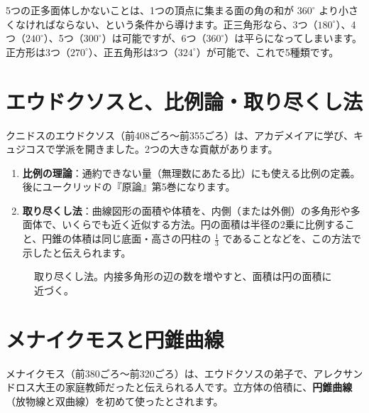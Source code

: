 \documentclass[a4paper,11pt,openany]{ltjsbook}
\begin{document}
5つの正多面体しかないことは、1つの頂点に集まる面の角の和が $360^\circ$ より小さくなければならない、という条件から導けます。正三角形なら、3つ（$180^\circ$）、4つ（$240^\circ$）、5つ（$300^\circ$）は可能ですが、6つ（$360^\circ$）は平らになってしまいます。正方形は3つ（$270^\circ$）、正五角形は3つ（$324^\circ$）が可能で、これで5種類です。

\section{エウドクソスと、比例論・取り尽くし法}

クニドスのエウドクソス（前408ごろ〜前355ごろ）は、アカデメイアに学び、キュジコスで学派を開きました。2つの大きな貢献があります。

\begin{enumerate}[leftmargin=*]
\item \textbf{比例の理論}：通約できない量（無理数にあたる比）にも使える比例の定義。後にユークリッドの『原論』第5巻になります。
\item \textbf{取り尽くし法}：曲線図形の面積や体積を、内側（または外側）の多角形や多面体で、いくらでも近く近似する方法。円の面積は半径の2乗に比例すること、円錐の体積は同じ底面・高さの円柱の $\tfrac13$ であることなどを、この方法で示したと伝えられます。

\end{enumerate}

\begin{figure}[htbp]
\centering
{}
\caption{取り尽くし法。内接多角形の辺の数を増やすと、面積は円の面積に近づく。}
\end{figure}

\section{メナイクモスと円錐曲線}

メナイクモス（前380ごろ〜前320ごろ）は、エウドクソスの弟子で、アレクサンドロス大王の家庭教師だったと伝えられる人です。立方体の倍積に、\textbf{円錐曲線}（放物線と双曲線）を初めて使ったとされます。
\end{document}
